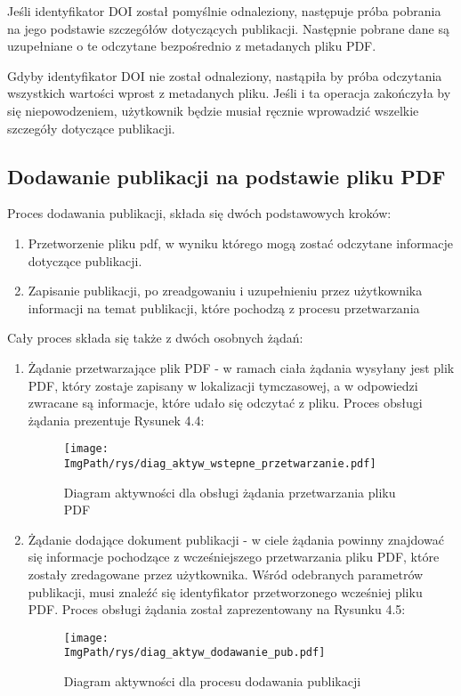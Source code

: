 \documentclass[a4paper,12pt,twoside,openany]{report}
\newcommand{\ImgPath}{.}
\begin{document}
Jeśli identyfikator DOI został pomyślnie odnaleziony, następuje próba pobrania na jego podstawie szczegółów dotyczących publikacji. Następnie pobrane dane są uzupełniane o te odczytane bezpośrednio z metadanych pliku PDF.

Gdyby identyfikator DOI nie został odnaleziony, nastąpiła by próba odczytania wszystkich wartości wprost z metadanych pliku. Jeśli i ta operacja zakończyła by się niepowodzeniem, użytkownik będzie musiał ręcznie wprowadzić wszelkie szczegóły dotyczące publikacji.

\subsection{Dodawanie publikacji na podstawie pliku PDF}
Proces dodawania publikacji, składa się dwóch podstawowych kroków:
\begin{enumerate}
	\item Przetworzenie pliku pdf, w wyniku którego mogą zostać odczytane informacje dotyczące publikacji.
	\item Zapisanie publikacji, po zreadgowaniu i uzupełnieniu przez użytkownika informacji na temat publikacji, które pochodzą z procesu przetwarzania
\end{enumerate}
Cały proces składa się także z dwóch osobnych żądań: 
\begin{enumerate}	
	\item Żądanie przetwarzające plik PDF - w ramach ciała żądania wysyłany jest plik PDF, który zostaje zapisany w lokalizacji tymczasowej, a w odpowiedzi zwracane są informacje, które udało się odczytać z pliku.  Proces obsługi żądania prezentuje Rysunek 4.4:
	\begin{figure}[!htbp]
		\begin{center}
			\centering
			\texttt{[image: \\ImgPath/rys/diag\_aktyw\_wstepne\_przetwarzanie.pdf]}
		\end{center}
		\caption{Diagram aktywności dla obsługi żądania przetwarzania pliku PDF}
		\label{diagramAktywnosciDodawanie}
	\end{figure}
	
	\item Żądanie dodające dokument publikacji - w ciele żądania powinny znajdować się informacje pochodzące z wcześniejszego przetwarzania pliku PDF, które zostały zredagowane przez użytkownika. Wśród odebranych parametrów publikacji, musi znaleźć się identyfikator przetworzonego wcześniej pliku PDF. Proces obsługi żądania został zaprezentowany na Rysunku 4.5:
	\begin{figure}[!htbp]
		\begin{center}
			\centering
			\texttt{[image: \\ImgPath/rys/diag\_aktyw\_dodawanie\_pub.pdf]}
		\end{center}
		\caption{Diagram aktywności dla procesu dodawania publikacji}
		\label{diagramAktywnosciDodawanie}
	\end{figure}
	
\end{enumerate}
\end{document}
